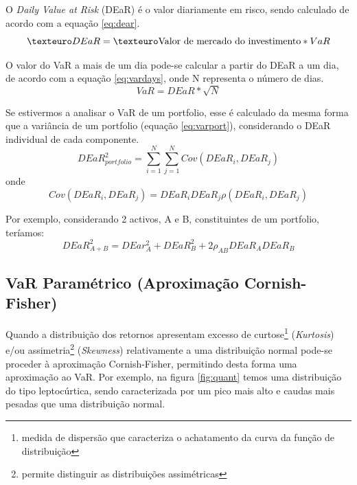 \documentclass[
  12pt,
  a4paper,
  openany]{book}
\begin{document}
O \emph{Daily Value at Risk} (DEaR) é o valor diariamente em risco, sendo calculado de acordo com a equação \eqref{eq:dear}.
\begin{equation} 
  €DEaR = € \textnormal{Valor de mercado do investimento} * VaR
  \label{eq:dear}  
\end{equation}

O valor do VaR a mais de um dia pode-se calcular a partir do DEaR a um dia, de acordo com a equação \eqref{eq:vardays}, onde N representa o número de dias.
\begin{equation} 
  VaR = DEaR*\sqrt{N}
  \label{eq:vardays}
\end{equation}

Se estivermos a analisar o VaR de um portfolio, esse é calculado da mesma forma que a variância de um portfolio (equação \eqref{eq:varport}), considerando o DEaR individual de cada componente.
\begin{equation} 
  DEaR_{portfolio}^{2} = \sum_{i=1}^{N}\sum_{j=1}^{N}Cov(DEaR_i,DEaR_j)
  \label{eq:varport}
\end{equation}
onde
\begin{equation} 
  Cov(DEaR_i,DEaR_j) = DEaR_{i}DEaR_{j}\rho(DEaR_i,DEaR_j)
  \label{eq:covport}
\end{equation}

Por exemplo, considerando 2 activos, A e B, constituintes de um portfolio, teríamos:
\begin{equation} 
  DEaR_{A+B}^{2} = DEar_{A}^{2}+DEaR_{B}^{2}+2\rho_{AB} DEaR_{A} DEaR_B
  \label{eq:ab}
\end{equation}

\hypertarget{var-paramuxe9trico-aproximauxe7uxe3o-cornish-fisher}{%
\subsection{VaR Paramétrico (Aproximação Cornish-Fisher)}\label{var-paramuxe9trico-aproximauxe7uxe3o-cornish-fisher}}

Quando a distribuição dos retornos apresentam excesso de curtose\footnote{medida de dispersão que caracteriza o achatamento da curva da função de distribuição} (\emph{Kurtosis}) e/ou assimetria\footnote{permite distinguir as distribuições assimétricas} (\emph{Skewness}) relativamente a uma distribuição normal pode-se proceder à aproximação Cornish-Fisher, permitindo desta forma uma aproximação ao VaR. Por exemplo, na figura \ref{fig:quant} temos uma distribuição do tipo leptocúrtica, sendo caracterizada por um pico mais alto e caudas mais pesadas que uma distribuição normal.
\bigskip
\end{document}
